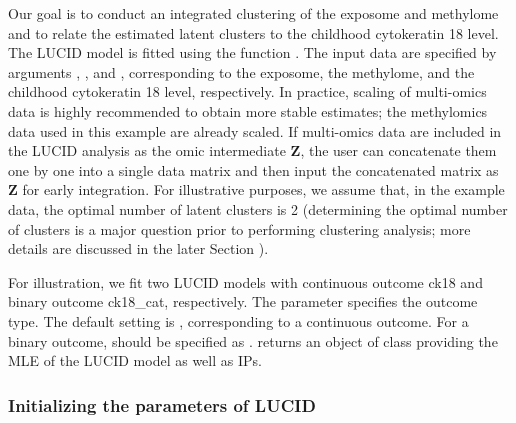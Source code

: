 Our goal is to conduct an integrated clustering of the exposome and methylome and to relate the estimated latent clusters to the childhood cytokeratin 18 level. The LUCID model is fitted using the function . The input data are specified by arguments , , and , corresponding to the exposome, the methylome, and the childhood cytokeratin 18 level, respectively. In practice, scaling of multi-omics data is highly recommended to obtain more stable estimates; the methylomics data used in this example are already scaled. If multi-omics data are included in the LUCID analysis as the omic intermediate $\bm Z$, the user can concatenate them one by one into a single data matrix and then input the concatenated matrix as $\bm Z$ for early integration. For illustrative purposes, we assume that, in the example data, the optimal number of latent clusters is 2 (determining the optimal number of clusters is a major question prior to performing clustering analysis; more details are discussed in the later Section ). 

For illustration, we fit two LUCID models with continuous outcome ck18 and binary outcome ck18\_cat, respectively. The parameter  specifies the outcome type. The default setting is , corresponding to a continuous outcome. For a binary outcome,  should be specified as .  returns an object of class  providing the MLE of the LUCID model as well as IPs.



\subsubsection{Initializing the parameters of LUCID} \label{sec3.1.1}

